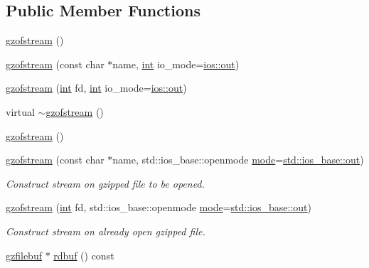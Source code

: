 \subsection*{Public Member Functions}
\begin{DoxyCompactItemize}
\item 
\mbox{\hyperlink{classgzofstream_ae92ce0e4696e29741ee979f08cf5f7d2}{gzofstream}} ()
\item 
\mbox{\hyperlink{classgzofstream_aad6a405bc9ecfd82cc0861a15e4a6983}{gzofstream}} (const char $\ast$name, \mbox{\hyperlink{ioapi_8h_a787fa3cf048117ba7123753c1e74fcd6}{int}} io\+\_\+mode=\mbox{\hyperlink{gun_8c_acb2d4658684492100bc328998f52ae82}{ios\+::out}})
\item 
\mbox{\hyperlink{classgzofstream_a5291a0c4c0e7f6f18ca72ae98f4e4d40}{gzofstream}} (\mbox{\hyperlink{ioapi_8h_a787fa3cf048117ba7123753c1e74fcd6}{int}} fd, \mbox{\hyperlink{ioapi_8h_a787fa3cf048117ba7123753c1e74fcd6}{int}} io\+\_\+mode=\mbox{\hyperlink{gun_8c_acb2d4658684492100bc328998f52ae82}{ios\+::out}})
\item 
virtual \mbox{\hyperlink{classgzofstream_a0bb8fbe1347ddee2e349f0038bc4bee0}{$\sim$gzofstream}} ()
\item 
\mbox{\hyperlink{classgzofstream_ae92ce0e4696e29741ee979f08cf5f7d2}{gzofstream}} ()
\item 
\mbox{\hyperlink{classgzofstream_a4334d31aab99f8c9c2277b672a55c78f}{gzofstream}} (const char $\ast$name, std\+::ios\+\_\+base\+::openmode \mbox{\hyperlink{ioapi_8h_a7e43d41c2fe013a373b540cba02505cf}{mode}}=\mbox{\hyperlink{gun_8c_acb2d4658684492100bc328998f52ae82}{std\+::ios\+\_\+base\+::out}})
\begin{DoxyCompactList}\small\item\em Construct stream on gzipped file to be opened. \end{DoxyCompactList}\item 
\mbox{\hyperlink{classgzofstream_aa94d0c8414119a52f2a7f42aa0440941}{gzofstream}} (\mbox{\hyperlink{ioapi_8h_a787fa3cf048117ba7123753c1e74fcd6}{int}} fd, std\+::ios\+\_\+base\+::openmode \mbox{\hyperlink{ioapi_8h_a7e43d41c2fe013a373b540cba02505cf}{mode}}=\mbox{\hyperlink{gun_8c_acb2d4658684492100bc328998f52ae82}{std\+::ios\+\_\+base\+::out}})
\begin{DoxyCompactList}\small\item\em Construct stream on already open gzipped file. \end{DoxyCompactList}\item 
\mbox{\hyperlink{classgzfilebuf}{gzfilebuf}} $\ast$ \mbox{\hyperlink{classgzofstream_a2fef74202b114357f41cfeb28f1d2acc}{rdbuf}} () const

\end{DoxyCompactItemize}

